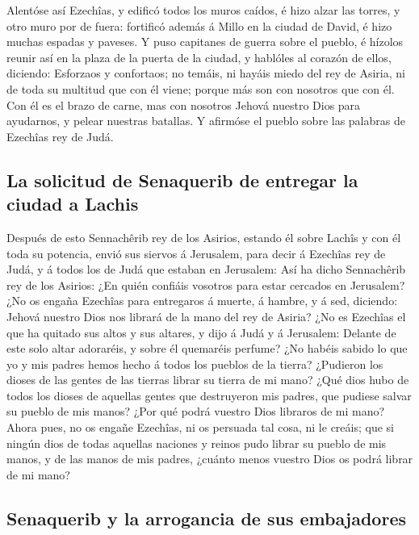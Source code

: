  Alentóse así Ezechîas, y edificó todos los muros caídos,
é hizo alzar las torres, y otro muro por de fuera: fortificó además á
Millo en la ciudad de David, é hizo muchas espadas y paveses.
 Y puso capitanes de guerra sobre el pueblo, é hízolos
reunir así en la plaza de la puerta de la ciudad, y hablóles al corazón
de ellos, diciendo:  Esforzaos y confortaos; no temáis, ni
hayáis miedo del rey de Asiria, ni de toda su multitud que con él viene;
porque más son con nosotros que con él.  Con él es el
brazo de carne, mas con nosotros Jehová nuestro Dios para ayudarnos, y
pelear nuestras batallas. Y afirmóse el pueblo sobre las palabras de
Ezechîas rey de Judá.

\hypertarget{la-solicitud-de-senaquerib-de-entregar-la-ciudad-a-lachis}{%
\subsection{La solicitud de Senaquerib de entregar la ciudad a
Lachis}\label{la-solicitud-de-senaquerib-de-entregar-la-ciudad-a-lachis}}

 Después de esto Sennachêrib rey de los Asirios, estando
él sobre Lachîs y con él toda su potencia, envió sus siervos á
Jerusalem, para decir á Ezechîas rey de Judá, y á todos los de Judá que
estaban en Jerusalem:  Así ha dicho Sennachêrib rey de
los Asirios: ¿En quién confiáis vosotros para estar cercados en
Jerusalem?  ¿No os engaña Ezechîas para entregaros á
muerte, á hambre, y á sed, diciendo: Jehová nuestro Dios nos librará de
la mano del rey de Asiria?  ¿No es Ezechîas el que ha
quitado sus altos y sus altares, y dijo á Judá y á Jerusalem: Delante de
este solo altar adoraréis, y sobre él quemaréis perfume? 
¿No habéis sabido lo que yo y mis padres hemos hecho á todos los pueblos
de la tierra? ¿Pudieron los dioses de las gentes de las tierras librar
su tierra de mi mano?  ¿Qué dios hubo de todos los dioses
de aquellas gentes que destruyeron mis padres, que pudiese salvar su
pueblo de mis manos? ¿Por qué podrá vuestro Dios libraros de mi mano?
 Ahora pues, no os engañe Ezechîas, ni os persuada tal
cosa, ni le creáis; que si ningún dios de todas aquellas naciones y
reinos pudo librar su pueblo de mis manos, y de las manos de mis padres,
¿cuánto menos vuestro Dios os podrá librar de mi mano?

\hypertarget{senaquerib-y-la-arrogancia-de-sus-embajadores}{%
\subsection{Senaquerib y la arrogancia de sus
embajadores}\label{senaquerib-y-la-arrogancia-de-sus-embajadores}}

